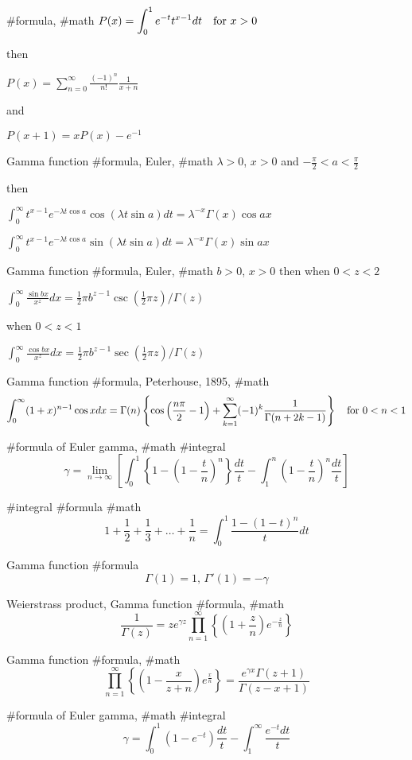 #formula, #math
$
P(x)=\displaystyle\int^1_0 e^{-t}t^{x-1}dt \quad {\rm for}\,\, x>0
$

then

$
P(x)=\displaystyle\sum^\infty_{n=0}\frac{(-1)^n}{n!}\frac{1}{x+n}
$

and

$
P(x+1)=x P(x)-e^{-1}
$

Gamma function #formula, Euler, #math
$\lambda>0$, $x>0$ and $-\frac{\pi}{2}<a<\frac{\pi}{2}$ 

then

$\displaystyle \int^\infty_0 t^{x-1}e^{-\lambda t\cos a}\cos(\lambda t\sin a)dt=\lambda^{-x}\Gamma(x)\cos ax
$

$\displaystyle \int^\infty_0 t^{x-1}e^{-\lambda t\cos a}\sin(\lambda t\sin a)dt=\lambda^{-x}\Gamma(x)\sin ax
$


Gamma function #formula, Euler, #math
$b>0$, $x>0$ then when $0<z<2$ 

$\displaystyle \int^\infty_0 \frac{\sin bx}{x^z} dx=\frac{1}{2}\pi b^{z-1}\csc\left(\frac{1}{2}\pi z\right)/\Gamma(z)
$

when $0<z<1$

$\displaystyle  \int^\infty_0 \frac{\cos bx}{x^z} dx=\frac{1}{2}\pi b^{z-1}\sec\left(\frac{1}{2}\pi z\right)/\Gamma(z)
$


Gamma function #formula, Peterhouse, 1895, #math
$$
\displaystyle \int^\infty_0 (1+x)^{n-1}\cos x dx = \Gamma(n)\left\{\cos\left(\frac{n\pi}{2}-1\right)+\sum^\infty_{k=1}(-1)^k\frac{1}{\Gamma(n+2k-1)}\right\} \quad {\rm for}\,\,0<n<1
$$

#formula of Euler gamma, #math #integral
$$
\gamma=\lim_{n\rightarrow\infty}\left[\int^1_0 \left\{1-\left(1-\frac{t}{n}\right)^n\right\}\frac{dt}{t}-\int^n_1\left(1-\frac{t}{n}\right)^n\frac{dt}{t}\right]
$$

#integral #formula #math
$$
1+\frac{1}{2}+\frac{1}{3}+\ldots+\frac{1}{n}=\int^1_0\frac{1-(1-t)^n}{t}dt
$$

Gamma function #formula
$$
\Gamma(1)=1, \, \Gamma'(1)=-\gamma
$$

Weierstrass product, Gamma function #formula, #math
$$
\frac{1}{\Gamma(z)}=z e^{\gamma z}\prod^\infty_{n=1}\left\{\left(1+\frac{z}{n}\right)e^{-\frac{z}{n}}\right\}
$$

Gamma function #formula, #math
$$
\prod^\infty_{n=1}\left\{\left(1-\frac{x}{z+n}\right)e^{\frac{x}{n}}\right\}=\frac{e^{\gamma x}\Gamma(z+1)}{\Gamma(z-x+1)}
$$

#formula of Euler gamma, #math #integral
$$
\gamma=\int^1_0(1-e^{-t})\frac{dt}{t}-\int^\infty_1\frac{e^{-t}dt}{t}
$$

